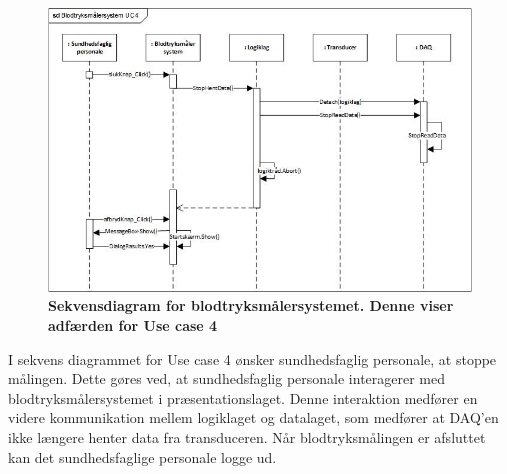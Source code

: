 \begin{figure}[H]
\includegraphics[width =1.0\textwidth , center]{billeder/sdUC4}
\caption{\textbf{Sekvensdiagram for blodtryksmålersystemet. Denne viser adfærden for Use case 4}}
\end{figure}
I sekvens diagrammet for Use case 4 ønsker sundhedsfaglig personale, at stoppe målingen. Dette gøres ved, at sundhedsfaglig personale interagerer med blodtryksmålersystemet i præsentationslaget. Denne interaktion medfører en videre kommunikation mellem logiklaget og datalaget, som medfører at DAQ'en ikke længere henter data fra transduceren. Når blodtryksmålingen er afsluttet kan det sundhedsfaglige personale logge ud. 
